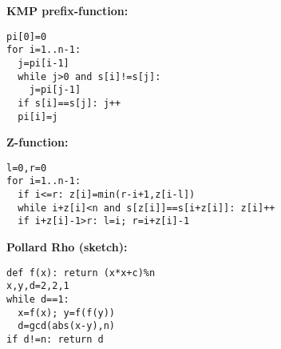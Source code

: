 \textbf{KMP prefix-function:}
\begin{verbatim}
pi[0]=0
for i=1..n-1:
  j=pi[i-1]
  while j>0 and s[i]!=s[j]:
    j=pi[j-1]
  if s[i]==s[j]: j++
  pi[i]=j
\end{verbatim}

\textbf{Z-function:}
\begin{verbatim}
l=0,r=0
for i=1..n-1:
  if i<=r: z[i]=min(r-i+1,z[i-l])
  while i+z[i]<n and s[z[i]]==s[i+z[i]]: z[i]++
  if i+z[i]-1>r: l=i; r=i+z[i]-1
\end{verbatim}

\textbf{Pollard Rho (sketch):}
\begin{verbatim}
def f(x): return (x*x+c)%n
x,y,d=2,2,1
while d==1:
  x=f(x); y=f(f(y))
  d=gcd(abs(x-y),n)
if d!=n: return d
\end{verbatim}